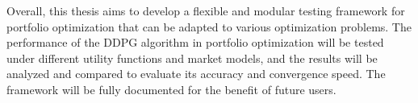 Overall, this thesis aims to develop a flexible and modular testing framework for portfolio optimization that can be adapted to various optimization problems. The performance of the DDPG algorithm in portfolio optimization will be tested under different utility functions and market models, and the results will be analyzed and compared to evaluate its accuracy and convergence speed. The framework will  be fully documented for the benefit of future users.





